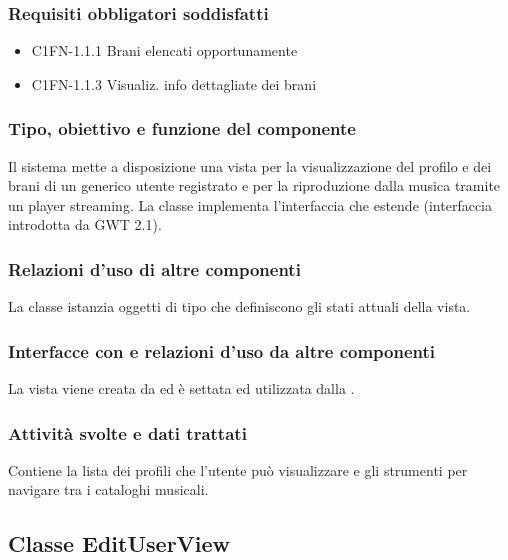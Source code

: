 \subsubsection*{Requisiti obbligatori soddisfatti}
\begin{itemize}
   \item C1FN-1.1.1 Brani elencati opportunamente
   \item C1FN-1.1.3 Visualiz. info dettagliate dei brani
\end{itemize}
\subsubsection*{Tipo, obiettivo e funzione del componente}
Il sistema mette a disposizione una vista per la visualizzazione del profilo e
dei brani di un generico utente registrato e per la riproduzione dalla musica
tramite un player streaming. La classe  implementa
l'interfaccia  che estende  (interfaccia introdotta
da GWT 2.1).
\subsubsection*{Relazioni d'uso di altre componenti} 
La classe istanzia oggetti di tipo  che definiscono gli stati
attuali della vista.
\subsubsection*{Interfacce con e relazioni d'uso da altre componenti}
 La vista viene creata da  ed \`e settata ed utilizzata dalla
 .
 \subsubsection*{Attivit\`a svolte e dati trattati}
Contiene la lista dei profili che l'utente pu\`o visualizzare e gli strumenti
per navigare tra i cataloghi musicali.

\subsection{Classe EditUserView}
